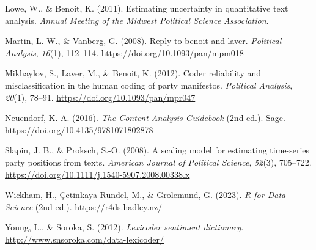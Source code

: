 \documentclass[
]{book}
\newlength{\cslhangindent}
\newenvironment{CSLReferences}[2] %
 {\begin{list}{}{%
  \setlength{\itemindent}{0pt}
  \setlength{\leftmargin}{0pt}
  \setlength{\parsep}{0pt}
  \ifodd #1
   \setlength{\leftmargin}{\cslhangindent}
   \setlength{\itemindent}{-1\cslhangindent}
  \fi
  \setlength{\itemsep}{#2\baselineskip}}}
 {\end{list}}
\begin{document}
\begin{CSLReferences}{1}{2}
Lowe, W., \& Benoit, K. (2011). Estimating uncertainty in quantitative text analysis. \emph{Annual Meeting of the Midwest Political Science Association}.

Martin, L. W., \& Vanberg, G. (2008). Reply to benoit and laver. \emph{Political Analysis}, \emph{16}(1), 112--114. \url{https://doi.org/10.1093/pan/mpm018}

Mikhaylov, S., Laver, M., \& Benoit, K. (2012). Coder reliability and misclassification in the human coding of party manifestos. \emph{Political Analysis}, \emph{20}(1), 78--91. \url{https://doi.org/10.1093/pan/mpr047}

Neuendorf, K. A. (2016). \emph{{The Content Analysis Guidebook}} (2nd ed.). Sage. \url{https://doi.org/10.4135/9781071802878}

Slapin, J. B., \& Proksch, S.-O. (2008). A scaling model for estimating time-series party positions from texts. \emph{American Journal of Political Science}, \emph{52}(3), 705--722. \url{https://doi.org/10.1111/j.1540-5907.2008.00338.x}

Wickham, H., Çetinkaya-Rundel, M., \& Grolemund, G. (2023). \emph{{R for Data Science}} (2nd ed.). \url{https://r4ds.hadley.nz/}

Young, L., \& Soroka, S. (2012). \emph{Lexicoder sentiment dictionary}. \url{http://www.snsoroka.com/data-lexicoder/}

\end{CSLReferences}
\end{document}
